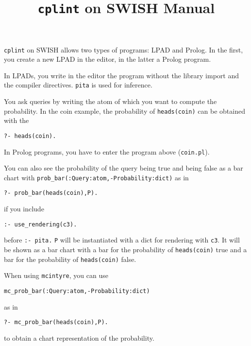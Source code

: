 \documentclass[a4paper,10pt]{scrartcl}
\begin{document}
\title{\texttt{cplint} on SWISH Manual}
\maketitle

%





\verb|cplint| on SWISH allows two types of programs: LPAD and Prolog. In the first, you create a new LPAD in the editor, in the latter a Prolog program. 

In LPADs, you write in the editor the program without the library import and the compiler directives. \verb|pita| is used for inference.

You ask queries by writing the atom of which you want to compute the probability. In the coin example, the probability of \verb|heads(coin)| can be obtained with the 
\begin{verbatim}
?- heads(coin).
\end{verbatim}

In Prolog programs, you have to enter the program above (\verb|coin.pl|).




You can also see the probability of the query being true and 
being false as a bar chart with \verb|prob_bar(:Query:atom,-Probability:dict)| as in
\begin{verbatim}
?- prob_bar(heads(coin),P).
\end{verbatim}
if you include
\begin{verbatim}
:- use_rendering(c3).
\end{verbatim}
before \verb|:- pita.| \verb|P| will be instantiated with a
dict for rendering with \verb|c3|. It will be shown as a bar chart with
a bar for the probability of \verb|heads(coin)| true and a bar for the probability of \verb|heads(coin)| false.


When using \verb|mcintyre|, you can use
\begin{verbatim}
mc_prob_bar(:Query:atom,-Probability:dict)
\end{verbatim}
as in
\begin{verbatim}
?- mc_prob_bar(heads(coin),P).
\end{verbatim}
to obtain a chart representation of the probability.
\end{document}
